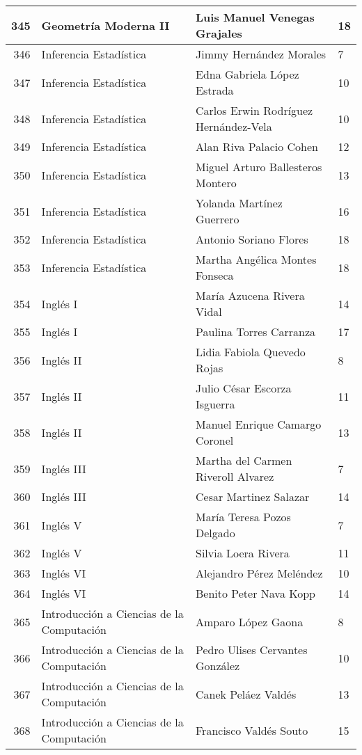 \begin{table}[ht]
\begin{tabular}{rlll}
  345 & Geometría Moderna II & Luis Manuel Venegas Grajales & 18 \\ \hline
  346 & Inferencia Estadística & Jimmy Hernández Morales & 7 \\ \hline
  347 & Inferencia Estadística & Edna Gabriela López Estrada & 10 \\ \hline
  348 & Inferencia Estadística & Carlos Erwin Rodríguez Hernández-Vela & 10 \\ \hline
  349 & Inferencia Estadística & Alan Riva Palacio Cohen & 12 \\ \hline
  350 & Inferencia Estadística & Miguel Arturo Ballesteros Montero & 13 \\ \hline
  351 & Inferencia Estadística & Yolanda Martínez Guerrero & 16 \\ \hline
  352 & Inferencia Estadística & Antonio Soriano Flores & 18 \\ \hline
  353 & Inferencia Estadística & Martha Angélica Montes Fonseca & 18 \\ \hline
  354 & Inglés I & María Azucena Rivera Vidal & 14 \\ \hline
  355 & Inglés I & Paulina Torres Carranza & 17 \\ \hline
  356 & Inglés II & Lidia Fabiola Quevedo Rojas & 8 \\ \hline
  357 & Inglés II & Julio César Escorza Isguerra & 11 \\ \hline
  358 & Inglés II & Manuel Enrique Camargo Coronel & 13 \\ \hline
  359 & Inglés III & Martha del Carmen Riveroll Alvarez & 7 \\ \hline
  360 & Inglés III & Cesar Martinez Salazar & 14 \\ \hline
  361 & Inglés V & María Teresa Pozos Delgado & 7 \\ \hline
  362 & Inglés V & Silvia Loera Rivera & 11 \\ \hline
  363 & Inglés VI & Alejandro Pérez Meléndez & 10 \\ \hline
  364 & Inglés VI & Benito Peter Nava Kopp & 14 \\ \hline
  365 & Introducción a Ciencias de la Computación & Amparo López Gaona & 8 \\ \hline
  366 & Introducción a Ciencias de la Computación & Pedro Ulises Cervantes González & 10 \\ \hline
  367 & Introducción a Ciencias de la Computación & Canek Peláez Valdés & 13 \\ \hline
  368 & Introducción a Ciencias de la Computación & Francisco Valdés Souto & 15 \\ \hline

\end{tabular}
\end{table}

